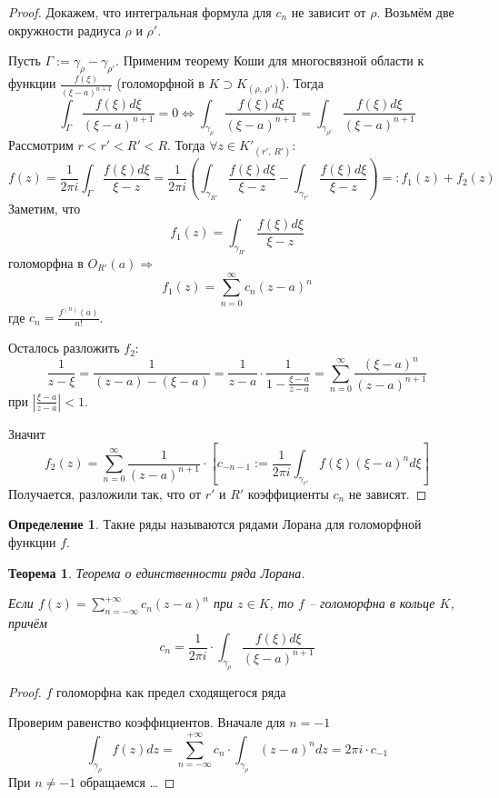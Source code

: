\documentclass[a4paper,12pt]{article}
\theoremstyle{plain}
\newtheorem{theorem}{Теорема}[section]
\theoremstyle{definition}
\newtheorem{definition}{Определение}[section]
\theoremstyle{remark}
\begin{document}
\begin{proof}
	Докажем, что интегральная формула для $c_n$ не зависит от $\rho$. Возьмём две окружности радиуса $\rho$ и $\rho'$.

	Пусть $\Gamma := \gamma_\rho - \gamma_{\rho'}$. Применим теорему Коши для многосвязной области к функции $\frac{f(\xi)}{(\xi - a)^{n + 1}}$ (голоморфной в $K \supset K_{(\rho,\,\rho')}$). Тогда
	\[
		\int_\Gamma\frac{f(\xi)d\xi}{(\xi - a)^{n + 1}} = 0 \Leftrightarrow \int_{\gamma_\rho}\frac{f(\xi)d\xi}{(\xi - a)^{n + 1}} = \int_{\gamma_{\rho'}}\frac{f(\xi)d\xi}{(\xi - a)^{n + 1}}
	\]
	Рассмотрим $r < r' < R' < R$. Тогда $\forall z \in K'_{(r',\, R')}$:
	\[
		f(z) = \frac{1}{2\pi i}\int_\Gamma\frac{f(\xi)d\xi}{\xi - z} = \frac{1}{2\pi i} \left(\int_{\gamma_{R'}}\frac{f(\xi)d\xi}{\xi - z} - \int_{\gamma_{r'}}\frac{f(\xi)d\xi}{\xi - z}\right) =: f_1(z) + f_2(z)
	\]
	Заметим, что
	\[
		f_1(z) = \int_{\gamma_{R'}}\frac{f(\xi)d\xi}{\xi - z}
	\]
	голоморфна в $O_{R'}(a) \Rightarrow$
	\[
		f_1(z) = \sum_{n = 0}^\infty c_n(z - a)^n
	\]
	где $c_n = \frac{f^{(n)}(a)}{n!}$.

	Осталось разложить $f_2$:
	\[
		\frac{1}{z - \xi} = \frac{1}{(z - a) - (\xi - a)} = \frac{1}{z - a} \cdot\frac{1}{1 - \frac{\xi - a}{z - a}} = \sum_{n = 0}^\infty \frac{(\xi - a)^n}{(z -a)^{n + 1}}
	\]
	при $\left\vert\frac{\xi - a}{z - a}\right\vert < 1$.

	Значит
	\[
		f_2(z) = \sum_{n = 0}^\infty \frac{1}{(z - a)^{n + 1}}\cdot\left[c_{-n - 1} := \frac{1}{2\pi i}\int_{\gamma_{r'}}f(\xi)(\xi - a)^nd\xi \right]
	\]
	Получается, разложили так, что от $r'$ и $R'$ коэффициенты $c_n$ не зависят.
\end{proof}

\begin{definition}
	Такие ряды называются рядами Лорана для голоморфной функции $f$.
\end{definition}

\begin{theorem}
	Теорема о единственности ряда Лорана.

	Если $f(z) = \sum_{n = -\infty}^{+\infty}c_n(z - a)^n$ при $z \in K$, то $f$ -- голоморфна в кольце $K$, причём
	\[
		c_n = \frac{1}{2\pi i}\cdot\int_{\gamma_\rho}\frac{f(\xi)d\xi}{(\xi - a)^{n + 1}}
	\]
\end{theorem}

\begin{proof}
	$f$ голоморфна как предел сходящегося ряда

	Проверим равенство коэффициентов. Вначале для $n = -1$
	\[
		\int_{\gamma_\rho} f(z)dz = \sum_{n = -\infty}^{+\infty} c_n\cdot\int_{\gamma_\rho}(z - a)^ndz = 2\pi i\cdot c_{-1}
	\]
	При $n \neq -1$ обращаемся \dots
\end{proof}
\end{document}
